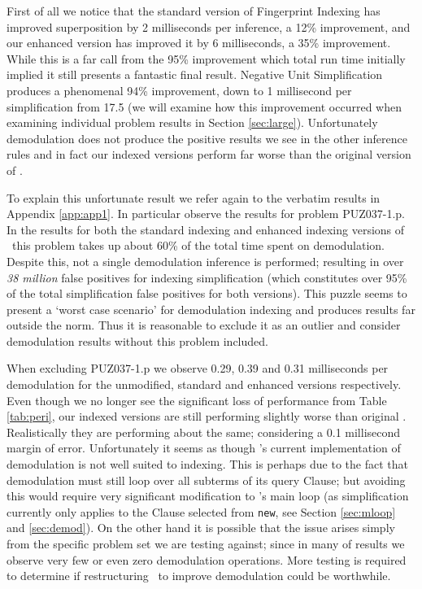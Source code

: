 First of all we notice that the standard version of Fingerprint Indexing has
improved superposition by 2 milliseconds per inference, a 12\% improvement,
and our enhanced version has improved it by 6 milliseconds, a 35\% improvement.
While this is a far call from the 95\% improvement which total run time initially
implied it still presents a fantastic final result. Negative Unit Simplification
produces a phenomenal 94\% improvement, down to 1 millisecond per simplification from 17.5
(we will examine how this improvement occurred when examining individual problem
results in Section \ref{sec:large}).
Unfortunately demodulation does not produce the positive results we see in the other
inference rules and in fact our indexed versions perform far worse than the original
version of \beagle.

To explain this unfortunate result we refer again to the verbatim results in
Appendix \ref{app:app1}. In particular observe the results for problem PUZ037-1.p.
In the results for both the standard indexing and enhanced indexing versions of \beagle\ 
this problem takes up about 60\% of the total time spent on demodulation. Despite
this, not a single demodulation inference is performed; resulting in over \emph{38 million}
false positives for indexing simplification (which constitutes over 95\% of the
total simplification false positives for both versions). This puzzle seems to present
a `worst case scenario' for demodulation indexing and produces results far outside the norm.
Thus it is reasonable to exclude it as an outlier and consider demodulation results
without this problem included.

When excluding PUZ037-1.p we observe 0.29, 0.39 and 0.31 milliseconds per demodulation
for the unmodified, standard and enhanced versions respectively. Even though we no
longer see the significant loss of performance from Table \ref{tab:peri}, our
indexed versions are still performing slightly worse than original \beagle. Realistically
they are performing about the same; considering a 0.1 millisecond margin of error. Unfortunately
it seems as though \beagle's current implementation of demodulation is not well suited
to indexing. This is perhaps due to the fact that demodulation must still loop
over all subterms of its query Clause; but avoiding this would require very significant
modification to \beagle's main loop (as simplification currently only applies to
the Clause selected from \verb!new!, see Section \ref{sec:mloop} and \ref{sec:demod}).
On the other hand it is possible that the issue arises simply from
the specific problem set we are testing against; since in many of results we observe
very few or even zero demodulation operations. More testing is required to determine
if restructuring \beagle\ to improve demodulation could be worthwhile.


